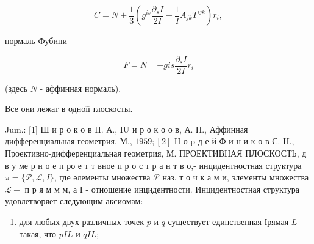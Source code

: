 \documentclass[10pt]{article}
\begin{document}
\[

C=N+\frac{1}{3}\left(g^{i s} \frac{\partial_{s} I}{2 I}-\frac{1}{I} A_{j k} T^{i j k}\right) r_{i},

\]



нормаль Фубини



\[

F=N \dashv-g i s \frac{\partial_{s} I}{2 I} r_{i}

\]



(здесь $N$ - аффинная нормаль).



Все они лежат в одноїі глоскосты.



Jum.: [1] Ш и р о к о в II. А., IU и р о к о о в, А. П., Аффинная дифференциальная геометрия, М., $1959 ;[2]$ Н о p д е й Ф и н и к о в С. II., Проективно-дифференциальная геометрия, М. ПРОЕКТИВНАЯ ПЛОСКОСТЬ, д в у ме р н о е п ро е т т вное п р о с т р а н т в о,- инцидентностная структура $\pi=\{\mathscr{P}, \mathscr{L}, I\}$, где әлементы множества $\mathscr{P}$ наз. т о ч к а м и, элементы множества $\mathscr{L}-$ п р я м м м, а I - отношение инцидентности. Инцидентностная структура удовлетворяет следующим аксиомам:



\begin{enumerate}

  \item для любых двух различных точек $p$ и $q$ существует единственная Ірямая $L$ такая, что $p I L$ и $q I L$;

\end{enumerate}
\end{document}
